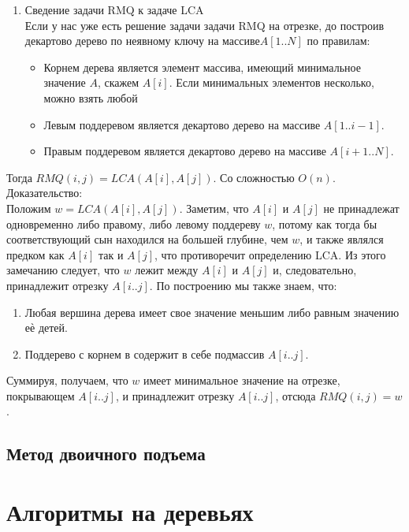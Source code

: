 \documentclass[a4paper]{article}
\begin{document}
\begin{enumerate}
	\item Сведение задачи RMQ к задаче LCA \\
	Если у нас уже есть решение задачи задачи RMQ на отрезке, до построив декартово дерево по неявному ключу на массиве$A[1..N]$ по правилам:
	\begin{itemize}
		\item Корнем дерева является элемент массива, имеющий минимальное значение $A$, скажем $A[i]$. Если минимальных элементов несколько, можно взять любой
		\item Левым поддеревом является декартово дерево на массиве $A[1..i-1]$.
		\item Правым поддеревом является декартово дерево на массиве $A[i+1..N]$.
	\end{itemize}
\end{enumerate}
Тогда $RMQ(i,j) = LCA(A[i],A[j])$. Со сложностью $O(n)$. Доказательство: \\
Положим $w=LCA(A[i],A[j])$. Заметим, что $A[i]$ и $A[j]$ не принадлежат одновременно либо правому, либо левому поддереву $w$, потому как тогда бы соответствующий сын находился на большей глубине, чем $w$, и также являлся предком как $A[i]$ так и $A[j]$, что противоречит определению LCA. Из этого замечанию следует, что $w$ лежит между $A[i]$ и $A[j]$ и, следовательно, принадлежит отрезку $A[i..j]$. По построению мы также знаем, что:
\begin{enumerate}
	\item Любая вершина дерева имеет свое значение меньшим либо равным значению еѐ детей.
	\item Поддерево с корнем в содержит в себе подмассив $A[i..j]$.
\end{enumerate}
Суммируя, получаем, что $w$ имеет минимальное значение на отрезке, покрывающем $A[i..j]$, и принадлежит отрезку $A[i..j]$, отсюда $RMQ(i,j)=w$.
\subsection{Метод двоичного подъема}

\section{Алгоритмы на деревьях}
\end{document}
